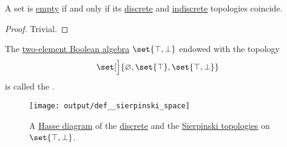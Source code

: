 \begin{proposition}\label{thm:empty_set_discrete_and_indiscrete_topologies}
  A set is \hyperref[def:empty_set]{empty} if and only if its \hyperref[def:discrete_topology]{discrete} and \hyperref[def:indiscrete_topology]{indiscrete} topologies coincide.
\end{proposition}
\begin{proof}
  Trivial.
\end{proof}

\begin{definition}\label{def:sierpinski_space}
  The \hyperref[def:boolean_algebra/trivial]{two-element Boolean algebra} \( \set{ \top, \bot } \) endowed with the topology
  \begin{equation*}
    \set[\Big]{ \varnothing, \set{ \top }, \set{ \top, \bot } }
  \end{equation*}
  is called the .

  \begin{figure}[!ht]
    \hfill
    \texttt{[image: output/def\_\_sierpinski\_space]}
    \hfill\hfill
    \caption{A \hyperref[def:hasse_diagram]{Hasse diagram} of the \hyperref[def:discrete_topology]{discrete} and the \hyperref[def:sierpinski_space]{Sierpinski topologies} on \( \set{ \top, \bot } \). }
    \label{fig:def:sierpinski_space}
  \end{figure}
\end{definition}

